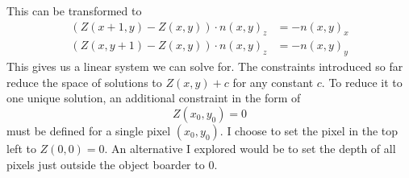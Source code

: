 \documentclass{paper}
\begin{document}
This can be transformed to
\begin{equation}
\begin{aligned}
	(Z(x+1,y) - Z(x,y)) \cdot n(x,y)_z &= -n(x,y)_x \\
	(Z(x,y+1) - Z(x,y)) \cdot n(x,y)_z &= -n(x,y)_y 
\end{aligned}
\end{equation}
This gives us a linear system we can solve for.
The constraints introduced so far reduce the space of 
solutions to $Z(x,y) + c$ for any constant $c$. To reduce
it to one unique solution, an additional constraint in the form of 
\begin{equation}
	Z(x_0, y_0) = 0
\end{equation}
must be defined for a single pixel $(x_0, y_0)$. I choose to set the pixel in the top left to $Z(0,0) = 0$. An alternative I explored 
would be to set the depth of all pixels just outside the object boarder to $0$. 
\end{document}

